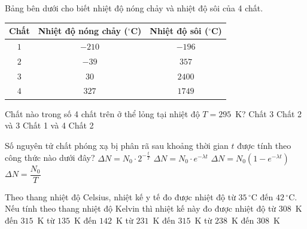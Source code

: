 	\begin{ex}%
		Bảng bên dưới cho biết nhiệt độ nóng chảy và nhiệt độ sôi của 4 chất.
		\begin{center}
			{\renewcommand{\arraystretch}{1.15}%
			\begin{tabular}{|c|c|c|}
				\hline
				\textbf{Chất} & \textbf{Nhiệt độ nóng chảy ($^\circ$C)} & \textbf{Nhiệt độ sôi ($^\circ$C)}\\
				\hline
				$1$ & $-210$ & $-196$\\
				\hline
				$2$ & $-39$ & $357$\\
				\hline
				$3$ & $30$ & $2400$\\
				\hline
				$4$ & $327$ & $1749$\\
				\hline
			\end{tabular}}
		\end{center}
		Chất nào trong số 4 chất trên ở thể lỏng tại nhiệt độ $T=295$~K?
		\choice
		{Chất 3}
		{Chất 2 và 3}
		{Chất 1 và 4}
		{\True Chất 2}
	\end{ex}

	\begin{ex}%
		Số nguyên tử chất phóng xạ bị phân rã sau khoảng thời gian $t$ được tính theo công thức nào dưới đây?
		\choice
		{$\Delta N=N_0\cdot 2^{-\frac{t}{T}}$}
		{$\Delta N=N_0\cdot e^{-\lambda t}$}
		{\True $\Delta N=N_0\left(1-e^{-\lambda t}\right)$}
		{$\Delta N=\dfrac{N_0}{T}$}
	\end{ex}

	\begin{ex}%
		Theo thang nhiệt độ Celsius, nhiệt kế y tế đo được nhiệt độ từ $35\,^\circ\text{C}$ đến $42\,^\circ\text{C}$. Nếu tính theo thang nhiệt độ Kelvin thì nhiệt kế này đo được nhiệt độ
		\choice
		{\True từ $308$~K đến $315$~K}
		{từ $135$~K đến $142$~K}
		{từ $231$~K đến $315$~K}
		{từ $238$~K đến $308$~K}
	\end{ex}

